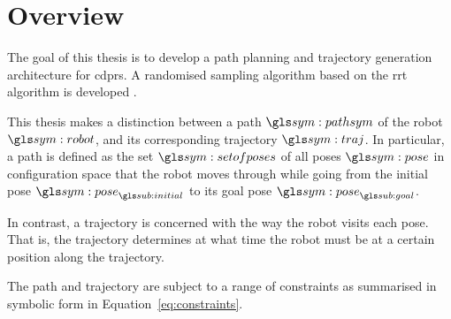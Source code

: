 \chapter{Overview}%
\label{chap:overview}

	The goal of this thesis is to develop a path planning and trajectory
	generation architecture for \glspl{cdpr}. A randomised sampling algorithm
	based on the \gls{rrt} algorithm is developed
	\cite{bib:planning:rapidly-exploring_random_trees_a_new_tool_for_path_planning}.

	This thesis makes a distinction between a path $\pathsym$ of the robot
	$\robot$, and its corresponding trajectory $\traj$. In particular, a path is
	defined as the set $\setofposes$ of all poses $\pose$ in configuration space
	that the robot moves through while going from the initial pose
	$\pose_{\initial}$ to its goal pose $\pose_{\goal}$.

	In contrast, a trajectory is concerned with the way the robot visits each
	pose. That is, the trajectory determines at what time the robot must be at a
	certain position along the trajectory.

	The path and trajectory are subject to a range of constraints as summarised
	in symbolic form in Equation~\ref{eq:constraints}.

